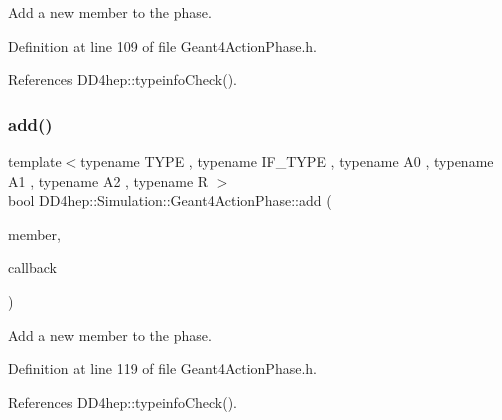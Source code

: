 Add a new member to the phase. 



Definition at line 109 of file Geant4\+Action\+Phase.\+h.



References D\+D4hep\+::typeinfo\+Check().

\hypertarget{class_d_d4hep_1_1_simulation_1_1_geant4_action_phase_a3c3f2f64c43945010765cfeea42a43f8}{}\label{class_d_d4hep_1_1_simulation_1_1_geant4_action_phase_a3c3f2f64c43945010765cfeea42a43f8} 
\subsubsection{\texorpdfstring{add()}{add()}\hspace{0.1cm}{\footnotesize\ttfamily [4/4]}}
{\footnotesize\ttfamily template$<$typename T\+Y\+PE , typename I\+F\+\_\+\+T\+Y\+PE , typename A0 , typename A1 , typename A2 , typename R $>$ \\
bool D\+D4hep\+::\+Simulation\+::\+Geant4\+Action\+Phase\+::add (\begin{DoxyParamCaption}\item[{T\+Y\+PE $\ast$}]{member,  }\item[{R(I\+F\+\_\+\+T\+Y\+P\+E\+::$\ast$)(A0 arg0, A1 arg1)}]{callback }\end{DoxyParamCaption})\hspace{0.3cm}{\ttfamily [inline]}}



Add a new member to the phase. 



Definition at line 119 of file Geant4\+Action\+Phase.\+h.



References D\+D4hep\+::typeinfo\+Check().

\hypertarget{class_d_d4hep_1_1_simulation_1_1_geant4_action_phase_a0c21acba218dc65cfa387dd4f14ceb4d}{}\label{class_d_d4hep_1_1_simulation_1_1_geant4_action_phase_a0c21acba218dc65cfa387dd4f14ceb4d} 
